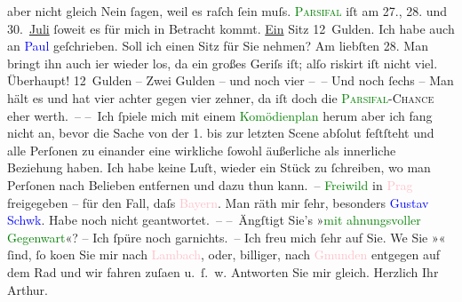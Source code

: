                aber nicht gleich Nein ſagen, weil es raſch ſein muſs. \textcolor{green}{\textsc{Parsifal}}{}\ledrightnote{\textcolor{green}{Parsifal}} iſt am 27., 28. und 30. \uline{Juli}{ }ſoweit es für mich in Betracht kommt. \uline{Ein}{ }Sitz 12 Gulden. Ich habe auch an \textcolor{blue}{Paul}{}\ledrightnote{\textcolor{blue}{Paul Goldmann}}
               geſchrieben. Soll ich ei{\pb}nen Sitz für Sie nehmen?
               Am liebſten 28. Man bringt ihn auch i{\geminationm}er
               wieder los, da ein großes Geriſs iſt; alſo riskirt iſt nicht viel. Überhaupt!
               12 Gulden – Zwei Gulden – und noch vier – – Und noch ſechs – Man {\pb}hält es und hat vier achter gegen vier zehner, da
               iſt doch die \textsc{\textcolor{green}{Parsifal}{}\ledrightnote{\textcolor{green}{Parsifal}}-Chance} eher werth. –\pend
           \pstart
           – Ich ſpiele mich mit einem \textcolor{green}{Komödienplan}{} herum {\dotsfour} aber ich fang nicht an,
               bevor die Sache von der 1. bis zur letzten Scene abſolut feſtſteht und alle {\pb}Perſonen zu einander eine wirkliche ſowohl
               äußerliche als innerliche Beziehung haben. Ich habe keine Luſt, wieder ein Stück zu
               ſchreiben, wo man Perſonen nach Belieben entfernen und dazu thun kann. – \textcolor{green}{Freiwild}{}\ledrightnote{\textcolor{green}{Freiwild. Schauspiel in 3 Akten}} in \textcolor{pink}{Prag}{}\ledrightnote{\textcolor{pink}{Prag}}
                  frei{\pb}gegeben – für den Fall, daſs \textcolor{pink}{Bayern}{}\ledrightnote{\textcolor{pink}{Bayern}}. Man räth mir ſehr, besonders \textcolor{blue}{Gustav Schwk}{}\ledrightnote{\textcolor{blue}{Gustav Schwarzkopf}}. Habe noch nicht geantwortet. –\pend
           \pstart
           – Ängſtigt Sie’s »\textcolor{green}{mit ahnungsvoller
                  Gegenwart}{}«? – Ich ſpüre noch garnichts. –\pend
           \pstart
           Ich freu mich ſehr auf Sie. We{\geminationn}{ }{\pb}Sie »\textsc{}« ſind, ſo ko{\geminationm}en
               Sie mir nach \textcolor{pink}{Lambach}{}\ledrightnote{\textcolor{pink}{Lambach}}, oder, billiger, nach \textcolor{pink}{Gmunden}{}\ledrightnote{\textcolor{pink}{Gmunden}} entgegen auf dem Rad und wir fahren zuſa{\geminationm}en u. ſ. w.\pend
           \pstart
           Antworten Sie mir gleich.\pend
           \pstart
           Herzlich Ihr{\\}\spacefill\mbox{Arthur.}\pend
           \endnumbering{}  
      